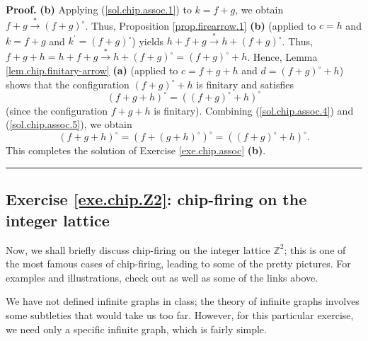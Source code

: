 \documentclass[numbers=enddot,12pt,final,onecolumn,notitlepage]{scrartcl}%
\newcounter{exer}
\theoremstyle{definition}
\newenvironment{proof}[1][Proof]{\noindent\textbf{#1.} }{\ \rule{0.5em}{0.5em}}
\newcommand{\ZZ}{\mathbb{Z}}
\begin{document}
\begin{proof}
\textbf{(b)} Applying (\ref{sol.chip.assoc.1}) to $k=f+g$, we obtain
$f+g\overset{\ast}{\rightarrow}\left(  f+g\right)  ^{\circ}$. Thus,
Proposition \ref{prop.firearrow.1} \textbf{(b)} (applied to $c=h$ and $k=f+g$
and $k^{\prime}=\left(  f+g\right)  ^{\circ}$) yields $h+f+g\overset{\ast
}{\rightarrow}h+\left(  f+g\right)  ^{\circ}$. Thus, $f+g+h=h+f+g\overset{\ast
}{\rightarrow}h+\left(  f+g\right)  ^{\circ}=\left(  f+g\right)  ^{\circ}+h$.
Hence, Lemma \ref{lem.chip.finitary-arrow} \textbf{(a)} (applied to $c=f+g+h$
and $d=\left(  f+g\right)  ^{\circ}+h$) shows that the configuration $\left(
f+g\right)  ^{\circ}+h$ is finitary and satisfies
\begin{equation}
\left(  f+g+h\right)  ^{\circ}=\left(  \left(  f+g\right)  ^{\circ}+h\right)
^{\circ} \label{sol.chip.assoc.5}%
\end{equation}
(since the configuration $f+g+h$ is finitary). Combining
(\ref{sol.chip.assoc.4}) and (\ref{sol.chip.assoc.5}), we obtain%
\[
\left(  f+g+h\right)  ^{\circ}=\left(  f+\left(  g+h\right)  ^{\circ}\right)
^{\circ}=\left(  \left(  f+g\right)  ^{\circ}+h\right)  ^{\circ}.
\]
This completes the solution of Exercise \ref{exe.chip.assoc} \textbf{(b)}.
\end{proof}

\subsection{Exercise \ref{exe.chip.Z2}: chip-firing on
the integer lattice}

Now, we shall briefly discuss chip-firing on the
integer lattice $\ZZ^2$; this is one of the most famous
cases of chip-firing, leading to some of the pretty
pictures.
For examples and illustrations, check out
\cite{Ellenb15} as well as some of the links above.

We have not defined infinite graphs in class; the
theory of infinite graphs involves some subtleties that
would take us too far.
However, for this particular exercise, we need only a
specific infinite graph, which is fairly simple.
\end{document}
